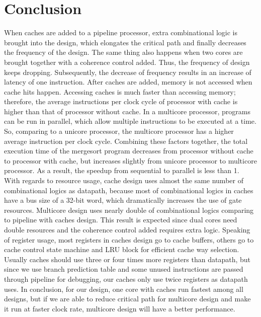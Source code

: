 \documentclass[12pt]{article}
\begin{document}
  \section{Conclusion}

  When caches are added to a pipeline processor, extra combinational logic is brought into the design, which elongates the critical path and finally decreases the frequency of the design. The same thing also happens when two cores are brought together with a coherence control added. Thus, the frequency of design keeps dropping. Subsequently, the decrease of frequency results in an increase of latency of one instruction. After caches are added, memory is not accessed when cache hits happen. Accessing caches is much faster than accessing memory; therefore, the average instructions per clock cycle of processor with cache is higher than that of processor without cache. In a multicore processor, programs can be run in parallel, which allow multiple instructions to be executed at a time. So, comparing to a unicore processor, the multicore processor has a higher average instruction per clock cycle. Combining these factors together, the total execution time of the mergesort program decreases from processor without cache to processor with cache, but increases slightly from unicore processor to multicore processor. As a result, the speedup from sequential to parallel is less than 1.\\
  With regards to resource usage, cache design uses almost the same number of combinational logics as datapath, because most of combinational logics in caches have a bus size of a 32-bit word, which dramatically increases the use of gate resources. Multicore design uses nearly double of combinational logics comparing to pipeline with caches design. This result is expected since dual cores need double resources and the coherence control added requires extra logic. Speaking of register usage, most registers in caches design go to cache buffers, others go to cache control state machine and LRU block for efficient cache way selection. Usually caches should use three or four times more registers than datapath, but since we use branch prediction table and some unused instructions are passed through pipeline for debugging, our caches only use twice registers as datapath uses. In conclusion, for our design, one core with caches run fastest among all designs, but if we are able to reduce critical path for multicore design and make it run at faster clock rate, multicore design will have a better performance.
\end{document}

